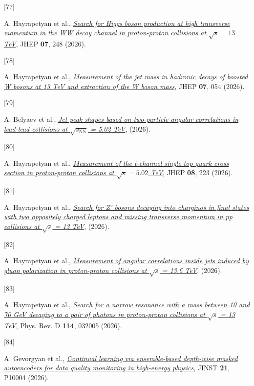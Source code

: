 \documentclass[
]{article}
\newlength{\cslhangindent}
\newlength{\csllabelwidth}
\newenvironment{CSLReferences}[2] %
 {\begin{list}{}{%
  \setlength{\itemindent}{0pt}
  \setlength{\leftmargin}{0pt}
  \setlength{\parsep}{0pt}
  \ifodd #1
   \setlength{\leftmargin}{\cslhangindent}
   \setlength{\itemindent}{-1\cslhangindent}
  \fi
  \setlength{\itemsep}{#2\baselineskip}}}
 {\end{list}}
\newcommand{\CSLLeftMargin}[1]{\parbox[t]{\csllabelwidth}{\strut#1\strut}}
\newcommand{\CSLRightInline}[1]{\parbox[t]{\linewidth - \csllabelwidth}{\strut#1\strut}}
\begin{document}
\begin{CSLReferences}{0}{0}
\CSLLeftMargin{{[}77{]} }%
\CSLRightInline{A. Hayrapetyan et al.,
\emph{\href{https://doi.org/10.1007/JHEP07(2026)248}{{Search for Higgs
boson production at high transverse momentum in the WW decay channel in
proton-proton collisions at \(\sqrt{s}=13\) TeV}}}, JHEP \textbf{07},
248 (2026).}

\CSLLeftMargin{{[}78{]} }%
\CSLRightInline{A. Hayrapetyan et al.,
\emph{\href{https://doi.org/10.1007/JHEP07(2026)054}{{Measurement of the
jet mass in hadronic decays of boosted W bosons at 13 TeV and extraction
of the W boson mass}}}, JHEP \textbf{07}, 054 (2026).}

\CSLLeftMargin{{[}79{]} }%
\CSLRightInline{A. Belyaev et al.,
\emph{\href{https://arxiv.org/abs/2603.14385}{{Jet peak shapes based on
two-particle angular correlations in lead-lead collisions at
\(\sqrt{s_{\mathrm{NN}}}\) = 5.02 TeV}}}, (2026).}

\CSLLeftMargin{{[}80{]} }%
\CSLRightInline{A. Hayrapetyan et al.,
\emph{\href{https://doi.org/10.1007/JHEP08(2026)223}{{Measurement of the
t-channel single top quark cross section in proton-proton collisions at
\(\sqrt{s}=5.02\) TeV}}}, JHEP \textbf{08}, 223 (2026).}

\CSLLeftMargin{{[}81{]} }%
\CSLRightInline{A. Hayrapetyan et al.,
\emph{\href{https://arxiv.org/abs/2603.11035}{{Search for Z' bosons
decaying into charginos in final states with two oppositely charged
leptons and missing transverse momentum in pp collisions at \(\sqrt{s}\)
= 13 TeV}}}, (2026).}

\CSLLeftMargin{{[}82{]} }%
\CSLRightInline{A. Hayrapetyan et al.,
\emph{\href{https://arxiv.org/abs/2603.03689}{{Measurement of angular
correlations inside jets induced by gluon polarization in proton-proton
collisions at \(\sqrt{s}\) = 13.6 TeV}}}, (2026).}

\CSLLeftMargin{{[}83{]} }%
\CSLRightInline{A. Hayrapetyan et al.,
\emph{\href{https://doi.org/10.1103/q2mh-7mhj}{{Search for a narrow
resonance with a mass between 10 and 70 GeV decaying to a pair of
photons in proton-proton collisions at \(\sqrt{s}\) = 13 TeV}}}, Phys.
Rev. D \textbf{114}, 032005 (2026).}

\CSLLeftMargin{{[}84{]} }%
\CSLRightInline{A. Gevorgyan et al.,
\emph{\href{https://doi.org/10.1088/1748-0221/21/10/P10004}{{Continual
learning via ensemble-based depth-wise masked autoencoders for data
quality monitoring in high-energy physics}}}, JINST \textbf{21}, P10004
(2026).}


\end{CSLReferences}
\end{document}
